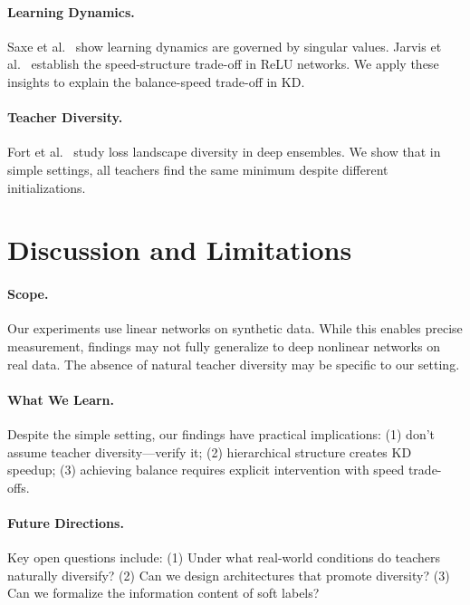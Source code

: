 \documentclass{article}
\begin{document}
\paragraph{Learning Dynamics.} Saxe et al.~\cite{saxe2014exact,saxe2022neural} show learning dynamics are governed by singular values. Jarvis et al.~\cite{jarvis2025makehaste} establish the speed-structure trade-off in ReLU networks. We apply these insights to explain the balance-speed trade-off in KD.

\paragraph{Teacher Diversity.} Fort et al.~\cite{fort2019deep} study loss landscape diversity in deep ensembles. We show that in simple settings, all teachers find the same minimum despite different initializations.

\section{Discussion and Limitations}
\label{sec:discussion}

\paragraph{Scope.} Our experiments use linear networks on synthetic data. While this enables precise measurement, findings may not fully generalize to deep nonlinear networks on real data. The absence of natural teacher diversity may be specific to our setting.

\paragraph{What We Learn.} Despite the simple setting, our findings have practical implications: (1) don't assume teacher diversity---verify it; (2) hierarchical structure creates KD speedup; (3) achieving balance requires explicit intervention with speed trade-offs.

\paragraph{Future Directions.} Key open questions include: (1) Under what real-world conditions do teachers naturally diversify? (2) Can we design architectures that promote diversity? (3) Can we formalize the information content of soft labels?
\end{document}
